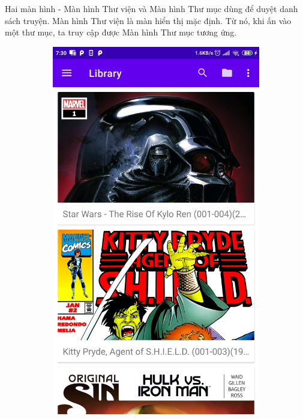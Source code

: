 \documentclass[../../thesis]{subfiles}
\begin{document}
Hai màn hình - Màn hình Thư viện và Màn hình Thư mục dùng để duyệt danh sách
truyện. Màn hình Thư viện là màn hiển thị mặc định. Từ nó, khi ấn vào một thư
mục, ta truy cập được Màn hình Thư mục tương ứng.

\begin{figure}[H]
    \centering
    \begin{subfigure}[b]{0.49\textwidth}
        \centering
        \includegraphics[scale=0.12]{../images/Screenshot_2021-05-25-07-30-21-599_com.uet.nvmnghia.yacv}

\end{subfigure}
\end{figure}
\end{document}
